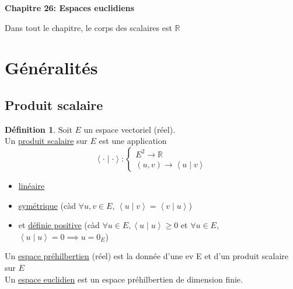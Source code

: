 \documentclass[10pt,a4paper]{article}
\theoremstyle{definition}
\newtheorem{definition}[proposition]{Définition}
\newcommand{\vp}[2]{\left< #1 \mid #2 \right>}
\begin{document}
\renewcommand{\labelitemi}{$*$}
\begin{center}
{\Large \textbf{Chapitre 26: Espaces euclidiens}}
\end{center}
Dans tout le chapitre, le corps des scalaires est $\mathbb{R}$

\section{Généralités}
\subsection{Produit scalaire}
\begin{definition}
Soit $E$ un espace vectoriel (réel). \\
Un \uline{produit scalaire} sur $E$ est une application
\[ \vp{\cdot}{\cdot} : \begin{cases}
E^2 \to \mathbb{R} \\
(u, v) \to \vp{u}{v}
\end{cases}\]
\begin{itemize}
\item \uline{linéaire}
\item \uline{symétrique} (càd $\forall u, v \in E$, $\vp{u}{v} = \vp{v}{u}$)
\item et \uline{définie positive} (càd $\forall u \in E, \vp{u}{u} \geq 0$ et $\forall u \in E$, $\vp{u}{u} = 0 \implies u = 0_E$)
\end{itemize}
Un \uline{espace préhilbertien} (réel) est la donnée d'une ev E et d'un produit scalaire sur $E$ \\
Un \uline{espace euclidien} est un espace préhilbertien de dimension finie.
\end{definition}
\end{document}
